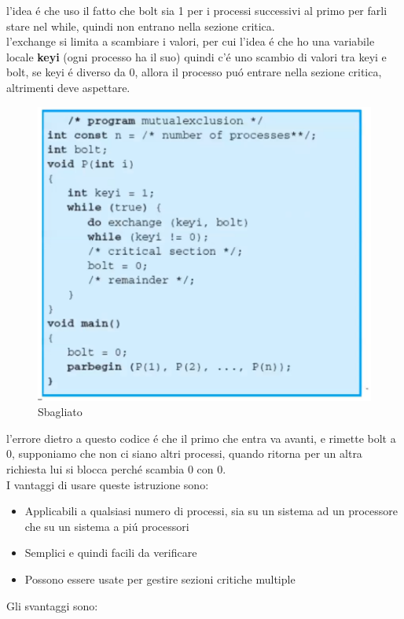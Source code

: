 l'idea é che uso il fatto che bolt sia 1 per i processi successivi al primo per farli stare nel while, quindi non entrano nella sezione critica.\\
\newline
l'exchange si limita a scambiare i valori, per cui l'idea é che ho una variabile locale \textbf{keyi} (ogni processo ha il suo) quindi c'é uno scambio
di valori tra keyi e bolt, se keyi é diverso da 0, allora il processo puó entrare nella sezione critica, altrimenti deve aspettare.
\begin{figure}[H]
    \centering
    \includegraphics[width=0.7\linewidth]{immagini/Exchange}
    \caption{Sbagliato}
\end{figure}
l'errore dietro a questo codice é che il primo che entra va avanti, e rimette bolt a 0, supponiamo che non ci siano altri processi, quando ritorna per un altra richiesta lui si
blocca perché scambia 0 con 0.\\
\newline
I vantaggi di usare queste istruzione sono:
\begin{itemize}
    \item Applicabili a qualsiasi numero di processi, sia su un sistema ad un processore che su un sistema a piú processori
    \item Semplici e quindi facili da verificare
    \item Possono essere usate per gestire sezioni critiche multiple
\end{itemize}
Gli svantaggi sono:
